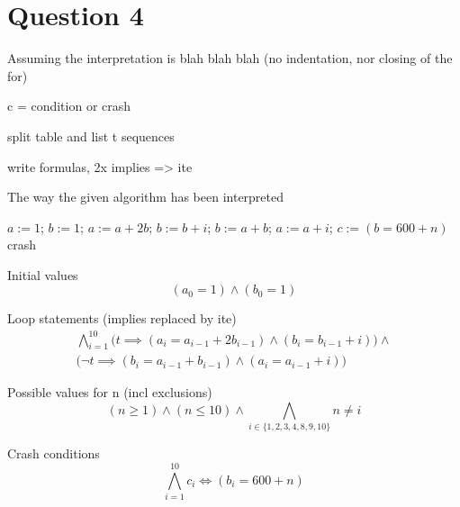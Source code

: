 \section{Question 4}
Assuming the interpretation is blah blah blah (no indentation, nor closing of the for)

c = condition or crash

split table and list t sequences 

write formulas, 2x implies => ite

\begin{algorithm}
  \caption{The way the given algorithm has been interpreted}
  \label{alg:4_improved}
  \begin{algorithmic}[1]
    \State $a := 1$;
    \State $b := 1$;
        \State $a := a + 2b$;
        \State $b := b + i$;
      \Else
        \State $b := a + b$;
        \State $a := a + i$;
      \EndIf
      \State $c := (b = 600 + n)$
        \State crash
      \EndIf
    \EndFor
  \end{algorithmic}
\end{algorithm}

Initial values
\begin{equation}
  \label{eqn:4_initial}
  (a_{0} = 1) \wedge (b_{0} = 1)
\end{equation}

Loop statements (implies replaced by ite)
\begin{equation}
  \label{eqn:4_loop}
  \begin{aligned}
    \bigwedge_{i = 1}^{10}
      \Big(t \implies (a_{i} = a_{i - 1} + 2b_{i - 1}) \wedge (b_{i} = b_{i - 1} + i)\Big) \wedge \\
      \Big(\neg t \implies (b_{i} = a_{i - 1} + b_{i - 1}) \wedge (a_{i} = a_{i - 1} + i)\Big)
    \end{aligned}
\end{equation}

Possible values for n (incl exclusions)
\begin{equation}
  \label{eqn:4_valn}
  (n \geq 1) \wedge (n \leq 10) \wedge
  \bigwedge_{i \in \{1, 2, 3, 4, 8, 9, 10\}} n \neq i
\end{equation}

Crash conditions
\begin{equation}
  \label{eqn:4_condcrash}
  \bigwedge_{i = 1}^{10}
    c_{i} \iff (b_{i} = 600 + n)
\end{equation}

